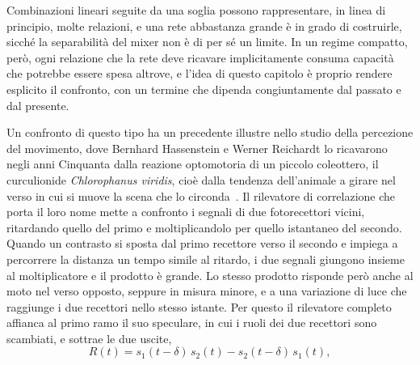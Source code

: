 Combinazioni lineari seguite da una soglia possono rappresentare, in linea di principio, molte relazioni, e una rete abbastanza grande è in grado di costruirle, sicché la separabilità del mixer non è di per sé un limite. In un regime compatto, però, ogni relazione che la rete deve ricavare implicitamente consuma capacità che potrebbe essere spesa altrove, e l'idea di questo capitolo è proprio rendere esplicito il confronto, con un termine che dipenda congiuntamente dal passato e dal presente.

Un confronto di questo tipo ha un precedente illustre nello studio della percezione del movimento, dove Bernhard Hassenstein e Werner Reichardt lo ricavarono negli anni Cinquanta dalla reazione optomotoria di un piccolo coleottero, il curculionide \emph{Chlorophanus viridis}, cioè dalla tendenza dell'animale a girare nel verso in cui si muove la scena che lo circonda~\cite{hassenstein1956systemtheoretische}. Il rilevatore di correlazione che porta il loro nome mette a confronto i segnali di due fotorecettori vicini, ritardando quello del primo e moltiplicandolo per quello istantaneo del secondo. Quando un contrasto si sposta dal primo recettore verso il secondo e impiega a percorrere la distanza un tempo simile al ritardo, i due segnali giungono insieme al moltiplicatore e il prodotto è grande. Lo stesso prodotto risponde però anche al moto nel verso opposto, seppure in misura minore, e a una variazione di luce che raggiunge i due recettori nello stesso istante. Per questo il rilevatore completo affianca al primo ramo il suo speculare, in cui i ruoli dei due recettori sono scambiati, e sottrae le due uscite,
\begin{equation}
\label{eq:reichardt}
R(t)=s_1(t-\delta)\,s_2(t)-s_2(t-\delta)\,s_1(t),
\end{equation}
